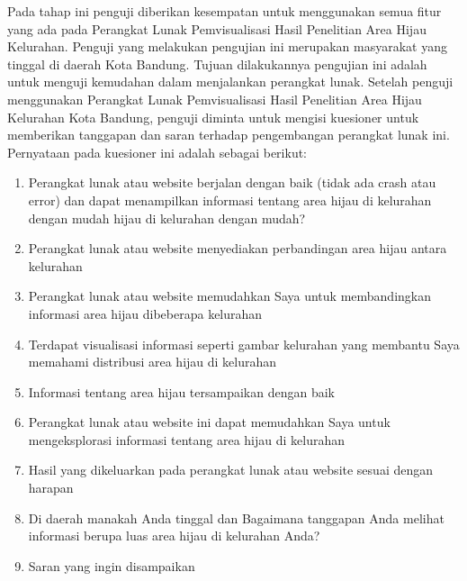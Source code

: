 Pada tahap ini penguji diberikan kesempatan untuk menggunakan semua fitur yang ada pada Perangkat Lunak Pemvisualisasi Hasil Penelitian Area Hijau Kelurahan. Penguji yang melakukan pengujian ini merupakan masyarakat yang tinggal di daerah Kota Bandung. Tujuan dilakukannya pengujian ini adalah untuk menguji kemudahan dalam menjalankan perangkat lunak. Setelah penguji menggunakan Perangkat Lunak Pemvisualisasi Hasil Penelitian Area Hijau Kelurahan Kota Bandung, penguji diminta untuk mengisi kuesioner untuk memberikan tanggapan dan saran terhadap pengembangan perangkat lunak ini. Pernyataan pada kuesioner ini adalah sebagai berikut:
\begin{enumerate}
	\item Perangkat lunak atau website berjalan dengan baik (tidak ada crash atau error) dan dapat menampilkan informasi tentang area hijau di kelurahan dengan mudah hijau di kelurahan dengan mudah?
	\item Perangkat lunak atau website menyediakan perbandingan area hijau antara kelurahan
	\item Perangkat lunak atau website memudahkan Saya untuk membandingkan informasi area hijau dibeberapa kelurahan
	\item Terdapat visualisasi informasi seperti gambar kelurahan yang membantu Saya memahami distribusi area hijau di kelurahan
	\item Informasi tentang area hijau tersampaikan dengan baik
	\item Perangkat lunak atau website ini dapat memudahkan Saya untuk  mengeksplorasi informasi tentang area hijau di kelurahan
	\item Hasil yang dikeluarkan pada perangkat lunak atau website sesuai dengan harapan 
	\item Di daerah manakah Anda tinggal  dan Bagaimana tanggapan Anda melihat informasi berupa luas area hijau di kelurahan Anda?
	\item Saran yang ingin disampaikan
\end{enumerate}

